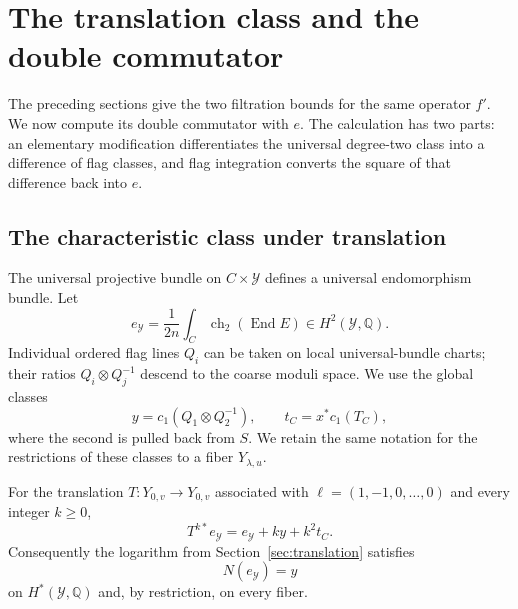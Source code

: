 \section{The translation class and the double commutator}\label{sec:commutator}

The preceding sections give the two filtration bounds for the same operator
$f'$.  We now compute its double commutator with $e$.  The calculation has two
parts: an elementary modification differentiates the universal degree-two
class into a difference of flag classes, and flag integration converts the
square of that difference back into $e$.

\subsection{The characteristic class under translation}

The universal projective bundle on $C\times\mathcal Y$ defines a universal
endomorphism bundle.  Let
\[
 e_{\mathcal Y}
   =\frac1{2n}\int_C\operatorname{ch}_2(\operatorname{End}E)
   \in H^2(\mathcal Y,\mathbb Q).
\]
Individual ordered flag lines $Q_i$ can be taken on local universal-bundle
charts; their ratios $Q_i\otimes Q_j^{-1}$ descend to the coarse moduli
space.  We use the global classes
\[
 y=c_1(Q_1\otimes Q_2^{-1}),\qquad
 t_C=x^*c_1(T_C),
\]
where the second is pulled back from $S$.  We retain the same notation for
the restrictions of these classes to a fiber $Y_{\lambda,u}$.

\begin{lemma}\label{calc:translation-formula}
For the translation $T:Y_{0,v}\to Y_{0,v}$ associated with
$\ell=(1,-1,0,\ldots,0)$ and every integer $k\ge0$,
\begin{equation}\label{calc:translation-polynomial}
 T^{k*}e_{\mathcal Y}=e_{\mathcal Y}+ky+k^2t_C.
\end{equation}
Consequently the logarithm from Section~\ref{sec:translation} satisfies
\begin{equation}\label{calc:logarithm}
 N(e_{\mathcal Y})=y
\end{equation}
on $H^*(\mathcal Y,\mathbb Q)$ and, by restriction, on every fiber.
\end{lemma}

